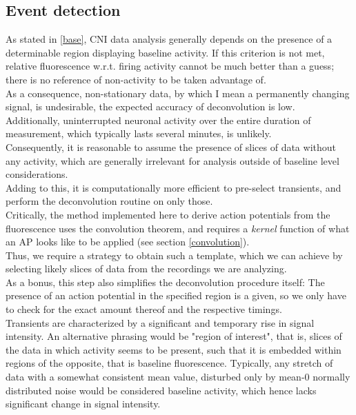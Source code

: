 \documentclass[titlepage]{article}
\begin{document}
\subsection{Event detection}\label{event}
As stated in \ref{base}, CNI data analysis generally depends on the presence of a determinable region displaying baseline activity. If this criterion is not met, relative fluorescence w.r.t. firing activity cannot be much better than a guess; there is no reference of non-activity to be taken advantage of.\\
As a consequence, non-stationary data, by which I mean a permanently changing signal, is undesirable, the expected accuracy of deconvolution is low.\\
Additionally, uninterrupted neuronal activity over the entire duration of measurement, which typically lasts several minutes, is unlikely.\\
Consequently, it is reasonable to assume the presence of slices of data without any activity, which are generally irrelevant for analysis outside of baseline level considerations.\\ 
Adding to this, it is computationally more efficient to pre-select transients, and perform the deconvolution routine on only those.\\
Critically, the method implemented here to derive action potentials from the fluorescence uses the convolution theorem, and requires a \emph{kernel} function of what an AP looks like to be applied (see section \ref{convolution}).\\
Thus, we require a strategy to obtain such a template, which we can achieve by selecting likely slices of data from the recordings we are analyzing.\\
As a bonus, this step also simplifies the deconvolution procedure itself: The presence of an action potential in the specified region is a given, so we only have to check for the exact amount thereof and the respective timings.\\
Transients are characterized by a significant and temporary rise in signal intensity.
An alternative phrasing would be "region of interest", that is, slices of the data in which activity seems to be present, such that it is embedded within regions of the opposite, that is baseline fluorescence. Typically, any stretch of data with a somewhat consistent mean value, disturbed only by mean-0 normally distributed noise would be considered baseline activity, which hence lacks significant change in signal intensity.\\
\end{document}
